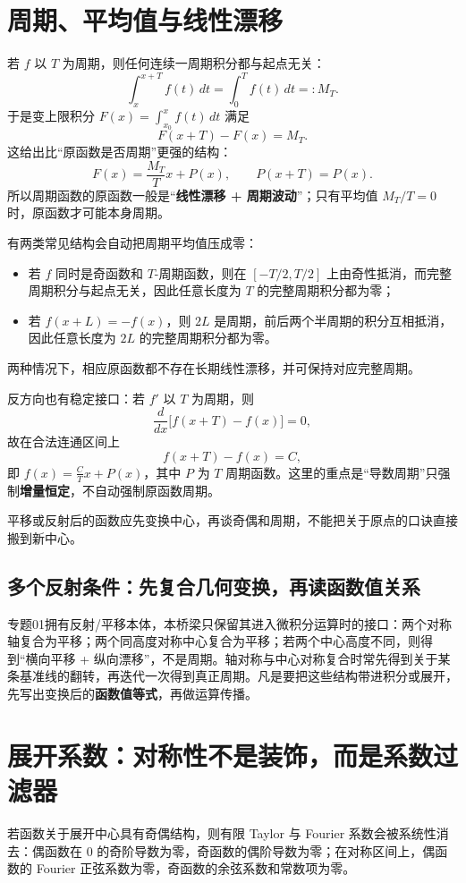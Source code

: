 \documentclass[11pt,a4paper]{ctexart}
\begin{document}
\section{周期、平均值与线性漂移}
若 $f$ 以 $T$ 为周期，则任何连续一周期积分都与起点无关：
\[
\int_x^{x+T}f(t)\,dt=\int_0^T f(t)\,dt=:M_T.
\]
于是变上限积分 $F(x)=\int_{x_0}^{x}f(t)\,dt$ 满足
\[
F(x+T)-F(x)=M_T.
\]
这给出比“原函数是否周期”更强的结构：
\[
\boxed{F(x)=\frac{M_T}{T}x+P(x)},\qquad P(x+T)=P(x).
\]
所以周期函数的原函数一般是“\textbf{线性漂移 + 周期波动}”；只有平均值 $M_T/T=0$ 时，原函数才可能本身周期。

\begin{center}

\end{center}

有两类常见结构会自动把周期平均值压成零：
\begin{itemize}
\item 若 $f$ 同时是奇函数和 $T$-周期函数，则在 $[-T/2,T/2]$ 上由奇性抵消，而完整周期积分与起点无关，因此任意长度为 $T$ 的完整周期积分都为零；
\item 若 $f(x+L)=-f(x)$，则 $2L$ 是周期，前后两个半周期的积分互相抵消，因此任意长度为 $2L$ 的完整周期积分都为零。
\end{itemize}
两种情况下，相应原函数都不存在长期线性漂移，并可保持对应完整周期。

反方向也有稳定接口：若 $f'$ 以 $T$ 为周期，则
\[
\frac{d}{dx}\bigl[f(x+T)-f(x)\bigr]=0,
\]
故在合法连通区间上
\[
f(x+T)-f(x)=C,
\]
即 $f(x)=\frac CT x+P(x)$，其中 $P$ 为 $T$ 周期函数。这里的重点是“导数周期”只强制\textbf{增量恒定}，不自动强制原函数周期。

平移或反射后的函数应先变换中心，再谈奇偶和周期，不能把关于原点的口诀直接搬到新中心。

\subsection{多个反射条件：先复合几何变换，再读函数值关系}
专题01拥有反射/平移本体，本桥梁只保留其进入微积分运算时的接口：两个对称轴复合为平移；两个同高度对称中心复合为平移；若两个中心高度不同，则得到“横向平移 + 纵向漂移”，不是周期。轴对称与中心对称复合时常先得到关于某条基准线的翻转，再迭代一次得到真正周期。凡是要把这些结构带进积分或展开，先写出变换后的\textbf{函数值等式}，再做运算传播。
\section{展开系数：对称性不是装饰，而是系数过滤器}
若函数关于展开中心具有奇偶结构，则有限 Taylor 与 Fourier 系数会被系统性消去：偶函数在 $0$ 的奇阶导数为零，奇函数的偶阶导数为零；在对称区间上，偶函数的 Fourier 正弦系数为零，奇函数的余弦系数和常数项为零。
\end{document}
